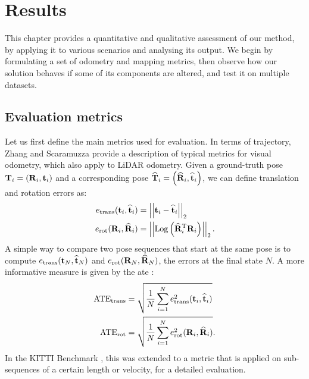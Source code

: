 \chapter{Results}
\label{ch:results}

This chapter provides a quantitative and qualitative assessment of our method, by applying it to various scenarios and analysing its output. We begin by formulating a set of odometry and mapping metrics, then observe how our solution behaves if some of its components are altered, and test it on multiple datasets.

\section{Evaluation metrics}
Let us first define the main metrics used for evaluation. In terms of trajectory, Zhang and Scaramuzza \cite{zhang2018tutorial} provide a description of typical metrics for visual odometry, which also apply to LiDAR odometry. Given a ground-truth pose
$\mathbf{T}_i = \left( \mathbf{R}_i, \mathbf{t}_i\right)$ and a corresponding pose
$\widehat{\mathbf{T}}_i = \left( \widehat{\mathbf{R}}_i, \widehat{\mathbf{t}}_i\right)$, we can define translation and rotation errors as:
\begin{equation}
    \begin{aligned}
        e_{\text{trans}}(\mathbf{t}_i, \widehat{\mathbf{t}}_i) & = \left|\left|{\mathbf{t}_i- \widehat{\mathbf{t}}_i}\right|\right|_2 \\
        e_{\text{rot}}(\mathbf{R}_i, \widehat{\mathbf{R}}_i )  & = \left|\left|{
            \text{Log}\left({{\widehat{\mathbf{R}}_i}^\text{T} \mathbf{R}_i}\right)
        }\right|\right|_2
        \text{.}
    \end{aligned}
\end{equation}
A simple way to compare two pose sequences that start at the same pose is to compute $e_{\text{trans}}(\mathbf{t}_N, \widehat{\mathbf{t}}_N)$ and $e_{\text{rot}}(\mathbf{R}_N, \widehat{\mathbf{R}}_N)$, the errors at the final state $N$. A more informative measure is given by the \acrfull{ate} \cite{kummerle2009measuring}:
\begin{equation}
    \begin{aligned}
        \text{ATE}_{\text{trans}} & = \sqrt{\frac{1}{N}\sum_{i=1}^{N} e_{\text{trans}}^2(\mathbf{t}_i, \widehat{\mathbf{t}}_i)} \\
        \text{ATE}_{\text{rot}}   & = \sqrt{\frac{1}{N}\sum_{i=1}^{N} e_{\text{rot}}^2(\mathbf{R}_i, \widehat{\mathbf{R}}_i )}
        \text{.}
    \end{aligned}
\end{equation}
In the KITTI Benchmark \cite{geiger2012kitti}, this was extended to a metric that is applied on sub-sequences of a certain length or velocity, for a detailed evaluation.

